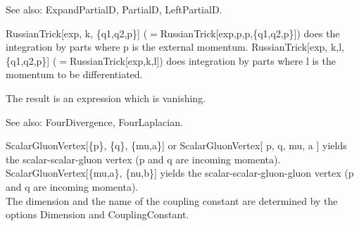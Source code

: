 See also:  ExpandPartialD, PartialD, LeftPartialD.







\dispSFoutmath{
\{ \}
}


\dispSFoutmath{
\{ \}
}


\dispSFoutmath{
\{ \}
}



RussianTrick[exp, k, \{q1,q2,p\}] (\(=\)RussianTrick[exp,p,p,\{q1,q2,p\}]) does the integration by parts where p is the external
  momentum. RussianTrick[exp, k,l, \{q1,q2,p\}] (\(=\)RussianTrick[exp,k,l]) does integration by parts where l is the momentum to be
  differentiated.

The result is an expression which is vanishing.

See also:  FourDivergence, FourLaplacian.



\dispSFoutmath{
\{ \}
}


\dispSFoutmath{
\{ \}
}


\dispSFoutmath{
\{ \}
}


\dispSFoutmath{
\mu
}

\dispSFinmath{
{{\partial }_{\mu }}
}


\dispSFinmath{
{{\left( \overvar{\partial }{\rightarrow } \right) }_{\mu }}
}



ScalarGluonVertex[\{p\}, \{q\}, \{mu,a\}] or ScalarGluonVertex[ p, { }q, { }mu, a ] yields the scalar-scalar-gluon vertex (p and q are
  incoming momenta).\\
ScalarGluonVertex[\{mu,a\}, \{nu,b\}] yields the scalar-scalar-gluon-gluon vertex (p and q are incoming momenta).\\
The dimension { }and the name of the coupling constant are determined by the options Dimension and CouplingConstant.

